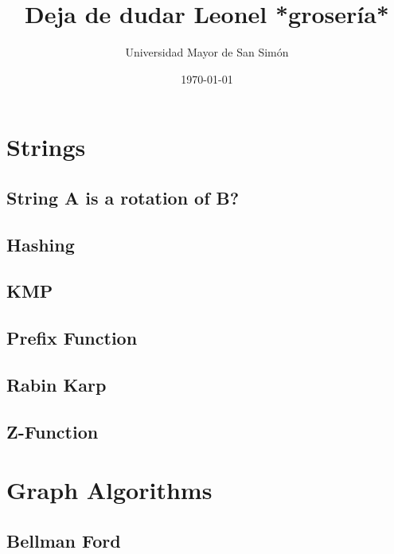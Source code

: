 \documentclass[twocolumn]{article}
\begin{document}
\title{Deja de dudar Leonel *grosería*}
\author{Universidad Mayor de San Simón}
\date{\today}
\maketitle

\tableofcontents
\newpage

\section{Strings}
\subsection{String A is a rotation of B?}
\raggedbottom
\hrulefill
\subsection{Hashing}
\raggedbottom
\hrulefill
\subsection{KMP}
\raggedbottom
\hrulefill
\subsection{Prefix Function}
\raggedbottom
\hrulefill
\subsection{Rabin Karp}
\raggedbottom
\hrulefill
\subsection{Z-Function}
\raggedbottom
\hrulefill

\section{Graph Algorithms}
\subsection{Bellman Ford}
\raggedbottom
\hrulefill
\end{document}
